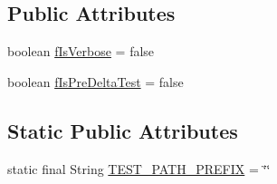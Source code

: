 \subsection*{Public Attributes}
\begin{DoxyCompactItemize}
\item 
boolean \hyperlink{classorg_1_1eclipse_1_1jdt_1_1ui_1_1tests_1_1refactoring_1_1infra_1_1RefactoringTest_a5a5685ebaef1a05eaad29c505dbb2a63}{fIsVerbose} = false
\item 
boolean \hyperlink{classorg_1_1eclipse_1_1jdt_1_1ui_1_1tests_1_1refactoring_1_1infra_1_1RefactoringTest_aac1c4a306842560f3f461f9a3bb05ba2}{fIsPreDeltaTest} = false
\end{DoxyCompactItemize}
\subsection*{Static Public Attributes}
\begin{DoxyCompactItemize}
\item 
static final String \hyperlink{classorg_1_1eclipse_1_1jdt_1_1ui_1_1tests_1_1refactoring_1_1infra_1_1RefactoringTest_acd2df0f1993be4d7c6010f0523df987e}{TEST\_\-PATH\_\-PREFIX} = \char`\"{}\char`\"{}
\end{DoxyCompactItemize}
